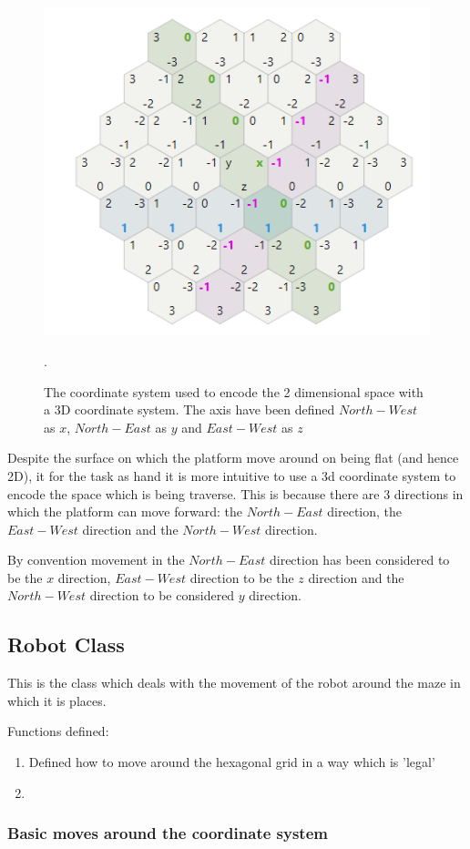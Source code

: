 \begin{figure}
    \centering
    \includegraphics[width=0.7\columnwidth]{images/hexagonal_coordinates.png}
    \caption{The coordinate system used to encode the 2 dimensional space with a 3D coordinate system. The axis have been defined $North-West$ as $x$, $North-East$ as  $y$ and $East-West$ as $z$}.
    \label{Hexagonal grid coordinates}
\end{figure}

Despite the surface on which the platform move around on being flat (and hence 2D), it for the task as hand it is more intuitive to use a 3d coordinate system to encode the space which is being traverse. This is because there are 3 directions in which the platform can move forward: the $North-East$ direction, the $East-West$ direction and the $North-West$ direction.

By convention movement in the $North-East$ direction has been considered to be the $x$ direction, $East-West$ direction to be the $z$ direction and the $North-West$ direction to be considered $y$ direction.
\subsection{Robot Class}

This is the class which deals with the movement of the robot around the maze in which it is places.

Functions defined:
\begin{enumerate}
    \item Defined how to move around the hexagonal grid in a way which is 'legal'
    \item
\end{enumerate}

\subsubsection{Basic moves around the coordinate system}


